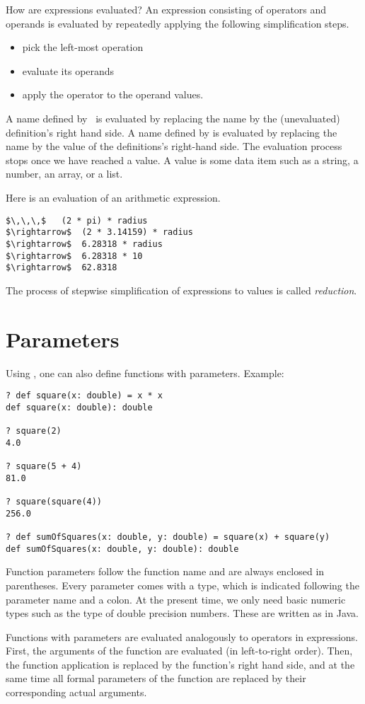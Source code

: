 \documentclass[a4paper,12pt,twoside,titlepage]{book}
\begin{document}
How are expressions evaluated? An expression consisting of operators
and operands is evaluated by repeatedly applying the following
simplification steps.
\begin{itemize}
\item pick the left-most operation
\item evaluate its operands
\item apply the operator to the operand values.
\end{itemize}
A name defined by \ is evaluated by replacing the name by the
(unevaluated) definition's right hand side. A name defined by  is
evaluated by replacing the name by the value of the definitions's
right-hand side.  The evaluation process stops once we have reached a
value. A value is some data item such as a string, a number, an array,
or a list.

\example
Here is an evaluation of an arithmetic expression.
\begin{lstlisting}
$\,\,\,$   (2 * pi) * radius
$\rightarrow$  (2 * 3.14159) * radius
$\rightarrow$  6.28318 * radius
$\rightarrow$  6.28318 * 10
$\rightarrow$  62.8318
\end{lstlisting}
The process of stepwise simplification of expressions to values is
called {\em reduction}.

\section{Parameters}

Using , one can also define functions with parameters. Example:
\begin{lstlisting}
? def square(x: double) = x * x
def square(x: double): double

? square(2)
4.0

? square(5 + 4)
81.0

? square(square(4))
256.0

? def sumOfSquares(x: double, y: double) = square(x) + square(y)
def sumOfSquares(x: double, y: double): double
\end{lstlisting}

Function parameters follow the function name and are always enclosed
in parentheses.  Every parameter comes with a type, which is indicated
following the parameter name and a colon. At the present time, we only
need basic numeric types such as the type  of double
precision numbers. These are written as in Java.

Functions with parameters are evaluated analogously to operators in
expressions. First, the arguments of the function are evaluated (in
left-to-right order). Then, the function application is replaced by
the function's right hand side, and at the same time all formal
parameters of the function are replaced by their corresponding actual
arguments.
\end{document}
